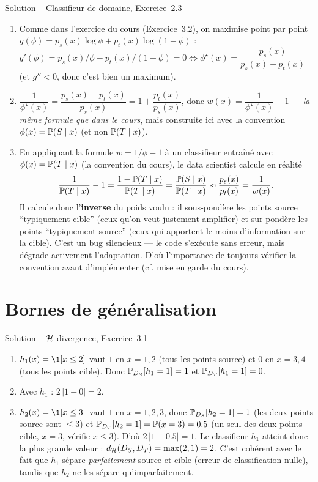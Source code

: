 \documentclass[11pt]{article}
\begin{document}
\begin{exercisebox}{Solution -- Classifieur de domaine, Exercice~2.3}
\begin{enumerate}[label=(\alph*)]
\item Comme dans l'exercice du cours (Exercice~3.2), on maximise point par point $g(\phi) = p_s(x)\log
\phi + p_t(x)\log(1-\phi)$ : $g'(\phi)=p_s(x)/\phi - p_t(x)/(1-\phi)=0 \iff \phi^\star(x) =
\dfrac{p_s(x)}{p_s(x)+p_t(x)}$ (et $g''<0$, donc c'est bien un maximum).
\item $\dfrac{1}{\phi^\star(x)} = \dfrac{p_s(x)+p_t(x)}{p_s(x)} = 1 + \dfrac{p_t(x)}{p_s(x)}$, donc
$w(x) = \dfrac{1}{\phi^\star(x)} - 1$ --- \emph{la même formule que dans le cours}, mais construite ici
avec la convention $\phi(x)=\P(S\mid x)$ (et non $\P(T\mid x)$).
\item En appliquant la formule $w=1/\phi-1$ à un classifieur entraîné avec $\phi(x)=\P(T\mid x)$ (la
convention du cours), le data scientist calcule en réalité
\[
\frac{1}{\P(T\mid x)} - 1 = \frac{1-\P(T\mid x)}{\P(T\mid x)} = \frac{\P(S\mid x)}{\P(T\mid x)} \approx
\frac{p_s(x)}{p_t(x)} = \frac{1}{w(x)}.
\]
Il calcule donc l'\textbf{inverse} du poids voulu : il sous-pondère les points source
\enquote{typiquement cible} (ceux qu'on veut justement amplifier) et sur-pondère les points
\enquote{typiquement source} (ceux qui apportent le moins d'information sur la cible). C'est un bug
silencieux --- le code s'exécute sans erreur, mais dégrade activement l'adaptation. D'où l'importance de
toujours vérifier la convention avant d'implémenter (cf. mise en garde du cours).
\end{enumerate}
\end{exercisebox}

\section{Bornes de généralisation}

\begin{exercisebox}{Solution -- $\Hcal$-divergence, Exercice~3.1}
\begin{enumerate}[label=(\alph*)]
\item $h_1(x)=\1[x\le 2]$ vaut $1$ en $x=1,2$ (tous les points source) et $0$ en $x=3,4$ (tous les
points cible). Donc $\P_{D_S}[h_1=1]=1$ et $\P_{D_T}[h_1=1]=0$.
\item Avec $h_1$ : $2\,|1-0| = 2$.
\item $h_2(x)=\1[x\le 3]$ vaut $1$ en $x=1,2,3$, donc $\P_{D_S}[h_2=1]=1$ (les deux points source sont
$\le 3$) et $\P_{D_T}[h_2=1]=\P(x=3)=0.5$ (un seul des deux points cible, $x=3$, vérifie $x\le3$). D'où
$2\,|1-0.5|=1$. Le classifieur $h_1$ atteint donc la plus grande valeur : $d_\Hcal(D_S,D_T) =
\max(2,1)=2$. C'est cohérent avec le fait que $h_1$ sépare \emph{parfaitement} source et cible (erreur de
classification nulle), tandis que $h_2$ ne les sépare qu'imparfaitement.
\end{enumerate}
\end{exercisebox}
\end{document}
